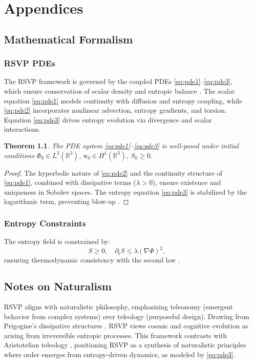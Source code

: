 \documentclass[12pt]{report}
\newtheorem{theorem}{Theorem}[chapter]
\newcommand{\PhiRSVP}{\Phi}
\newcommand{\vRSVP}{\mathbf{v}}
\newcommand{\SRSVP}{S}
\begin{document}
\part{Appendices}

\appendix
\chapter{Mathematical Formalism}
\label{app:A}
\section{RSVP PDEs}
The RSVP framework is governed by the coupled PDEs \eqref{eq:pde1}--\eqref{eq:pde3}, which ensure conservation of scalar density and entropic balance \citep{RSVPMeta2025}. The scalar equation \eqref{eq:pde1} models continuity with diffusion and entropy coupling, while \eqref{eq:pde2} incorporates nonlinear advection, entropy gradients, and torsion. Equation \eqref{eq:pde3} drives entropy evolution via divergence and scalar interactions.

\begin{theorem}
The PDE system \eqref{eq:pde1}--\eqref{eq:pde3} is well-posed under initial conditions \(\PhiRSVP_0 \in L^2(\mathbb{R}^3)\), \(\vRSVP_0 \in H^1(\mathbb{R}^3)\), \(\SRSVP_0 \geq 0\).
\end{theorem}
\begin{proof}
The hyperbolic nature of \eqref{eq:pde2} and the continuity structure of \eqref{eq:pde1}, combined with dissipative terms (\(\lambda > 0\)), ensure existence and uniqueness in Sobolev spaces. The entropy equation \eqref{eq:pde3} is stabilized by the logarithmic term, preventing blow-up \citep{Evans2010}.
\end{proof}

\section{Entropy Constraints}
The entropy field is constrained by:
\begin{equation}
\SRSVP \geq 0, \quad \partial_t \SRSVP \leq \lambda (\nabla \PhiRSVP)^2,
\end{equation}
ensuring thermodynamic consistency with the second law \citep{Prigogine1977}.

\chapter{Notes on Naturalism}
\label{app:B}
RSVP aligns with naturalistic philosophy, emphasizing teleonomy (emergent behavior from complex systems) over teleology (purposeful design). Drawing from Prigogine’s dissipative structures \citep{Prigogine1977}, RSVP views cosmic and cognitive evolution as arising from irreversible entropic processes. This framework contrasts with Aristotelian teleology \citep{AristotlePhysics}, positioning RSVP as a synthesis of naturalistic principles where order emerges from entropy-driven dynamics, as modeled by \eqref{eq:pde3}.
\end{document}
